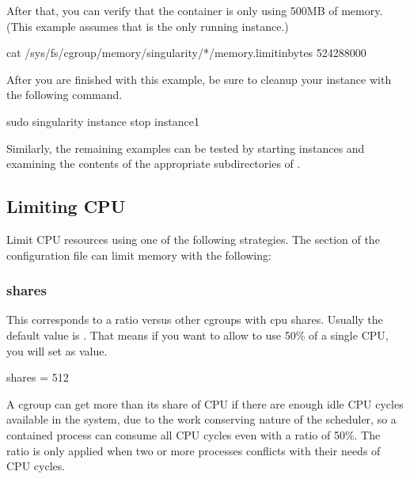 \documentclass[letterpaper,10pt,english]{sphinxmanual}
\begin{document}
After that, you can verify that the container is only using 500MB of memory.
(This example assumes that  is the only running instance.)

%
\begin{sphinxVerbatim}[commandchars=\\\{\}]
\PYGZdl{} cat /sys/fs/cgroup/memory/singularity/*/memory.limit\PYGZus{}in\PYGZus{}bytes
524288000
\end{sphinxVerbatim}

After you are finished with this example, be sure to cleanup your instance with
the following command.

%
\begin{sphinxVerbatim}[commandchars=\\\{\}]
\PYGZdl{} sudo singularity instance stop instance1
\end{sphinxVerbatim}

Similarly, the remaining examples can be tested by starting instances and
examining the contents of the appropriate subdirectories of .


\subsection{Limiting CPU}
\label{\detokenize{cgroups:limiting-cpu}}
Limit CPU resources using one of the following strategies. The  section
of the configuration file can limit memory with the following:


\subsubsection{shares}
\label{\detokenize{cgroups:shares}}
This corresponds to a ratio versus other cgroups with cpu shares. Usually the
default value is . That means if you want to allow to use 50\% of a
single CPU, you will set  as value.

%
\begin{sphinxVerbatim}[commandchars=\\\{\}]
[cpu]
    shares = 512
\end{sphinxVerbatim}

A cgroup can get more than its share of CPU if there are enough idle CPU cycles
available in the system, due to the work conserving nature of the scheduler, so
a contained process can consume all CPU cycles even with a ratio of 50\%. The
ratio is only applied when two or more processes conflicts with their needs of
CPU cycles.
\end{document}
